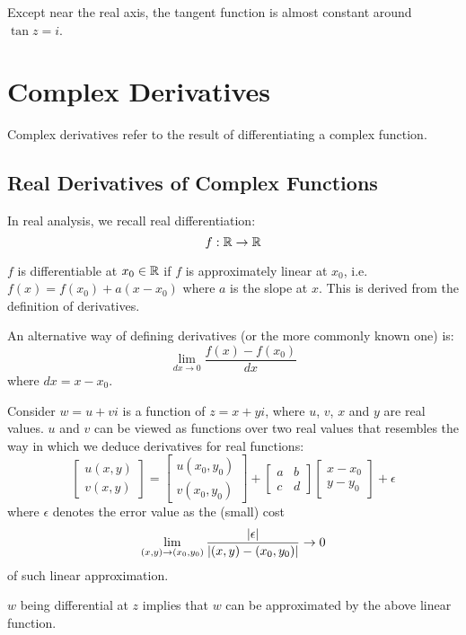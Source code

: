 \documentclass[12pt]{article}
\begin{document}
	Except near the real axis, the tangent function is almost constant around $\tan z = i$.
	
	\section{Complex Derivatives}
	
	Complex derivatives refer to the result of differentiating a complex function.
	
	\subsection{Real Derivatives of Complex Functions}
	
	In real analysis, we recall real differentiation: $$f: \mathbb{R} \to \mathbb{R}$$
	
	$f$ is differentiable at $x_0 \in \mathbb{R}$ if $f$ is approximately linear at $x_0$, i.e. $f(x) = f(x_0) + a(x - x_0)$ where $a$ is the slope at $x$. This is derived from the definition of derivatives.
	
	An alternative way of defining derivatives (or the more commonly known one) is: $$\lim_{dx \to 0} \frac{f(x) - f(x_0)}{dx}$$ where $dx = x - x_0$.
	
	Consider $w = u + vi$ is a function of $z = x + yi$, where $u$, $v$, $x$ and $y$ are real values. $u$ and $v$ can be viewed as functions over two real values that resembles the way in which we deduce derivatives for real functions:
	\begin{equation*}
		\begin{bmatrix}
			u(x, y) \\ v(x, y)
		\end{bmatrix} = 
		\begin{bmatrix}
			u(x_0, y_0) \\ v(x_0, y_0)
		\end{bmatrix} +
		\begin{bmatrix}
			a & b \\c & d
		\end{bmatrix}
		\begin{bmatrix}
			x - x_0 \\ y - y_0
		\end{bmatrix}  + \epsilon
	\end{equation*}
	where $\epsilon$ denotes the error value as the (small)  cost $$\lim_{(x, y)  \to (x_0, y_0)}\frac{\lvert \epsilon \rvert}{\lvert (x, y) - (x_0, y_0) \rvert} \to 0$$
	of such linear approximation.
	
	$w$ being differential at $z$ implies that $w$ can be approximated by the above linear function.
	
\end{document}
